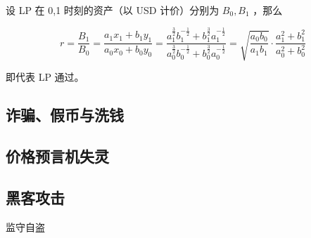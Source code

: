 \documentclass[12pt, a4paper, oneside]{ctexart}
\begin{document}
\noindent 设 LP 在 0,1 时刻的资产（以 USD 计价）分别为 $B_0,B_1$ ，那么

\begin{equation}
    r = \frac{B_1}{B_0} 
    = \frac{a_1x_1+b_1y_1}{a_0x_0+b_0y_0} 
    = \frac{a_1^{\frac{3}{2}}b_1^{-\frac{1}{2}} + b_1^{\frac{3}{2}}a_1^{-\frac{1}{2}}}{a_0^{\frac{3}{2}}b_0^{-\frac{1}{2}} + b_0^{\frac{3}{2}}a_0^{-\frac{1}{2}}} 
    = \sqrt{\frac{a_0b_0}{a_1b_1}} \cdot \frac{a_1^2+b_1^2}{a_0^2+b_0^2}
\end{equation}

\noindent 即代表 LP 通过。

\subsection{诈骗、假币与洗钱}

\subsection{价格预言机失灵}

\subsection{黑客攻击}

监守自盗
\end{document}
